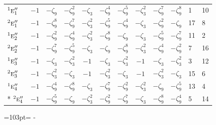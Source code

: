 \documentclass[10pt,a4paper]{article}
\newcommand{\needspace}[1]{\par\penalty-100\begingroup\dimen0=#1\relax\dimen2=\pagegoal
  \advance\dimen2-\pagetotal\ifdim\dimen0>\dimen2\relax\ifdim\dimen2>0pt\vfil\break\fi\fi
  \endgroup}
\numberwithin{equation}{section}
\newcommand{\irr}[1]{\text{\normalfont\scshape #1}}
\newcommand{\conjpair}[1]{{}^{#1}}
\newcommand{\rootunity}[1]{\zeta_{#1}}
\begin{document}
{\begin{longtable}{@{}lcccccccccll@{}}
$\conjpair{1}\irr{e}_{1}''$ & $-1$ & $-\rootunity{9}$ & $-\rootunity{9}^{2}$ & $-\rootunity{3}$ & $-\rootunity{9}^{4}$ & $-\rootunity{9}^{5}$ & $-\rootunity{3}^{2}$ & $-\rootunity{9}^{7}$ & $-\rootunity{9}^{8}$ & 1 & 10\\
$\conjpair{2}\irr{e}_{1}''$ & $-1$ & $-\rootunity{9}^{8}$ & $-\rootunity{9}^{7}$ & $-\rootunity{3}^{2}$ & $-\rootunity{9}^{5}$ & $-\rootunity{9}^{4}$ & $-\rootunity{3}$ & $-\rootunity{9}^{2}$ & $-\rootunity{9}$ & 17 & 8\\
$\conjpair{1}\irr{e}_{2}''$ & $-1$ & $-\rootunity{9}^{2}$ & $-\rootunity{9}^{4}$ & $-\rootunity{3}^{2}$ & $-\rootunity{9}^{8}$ & $-\rootunity{9}$ & $-\rootunity{3}$ & $-\rootunity{9}^{5}$ & $-\rootunity{9}^{7}$ & 11 & 2\\
$\conjpair{2}\irr{e}_{2}''$ & $-1$ & $-\rootunity{9}^{7}$ & $-\rootunity{9}^{5}$ & $-\rootunity{3}$ & $-\rootunity{9}$ & $-\rootunity{9}^{8}$ & $-\rootunity{3}^{2}$ & $-\rootunity{9}^{4}$ & $-\rootunity{9}^{2}$ & 7 & 16\\
$\conjpair{1}\irr{e}_{3}''$ & $-1$ & $-\rootunity{3}$ & $-\rootunity{3}^{2}$ & $-1$ & $-\rootunity{3}$ & $-\rootunity{3}^{2}$ & $-1$ & $-\rootunity{3}$ & $-\rootunity{3}^{2}$ & 3 & 12\\
$\conjpair{2}\irr{e}_{3}''$ & $-1$ & $-\rootunity{3}^{2}$ & $-\rootunity{3}$ & $-1$ & $-\rootunity{3}^{2}$ & $-\rootunity{3}$ & $-1$ & $-\rootunity{3}^{2}$ & $-\rootunity{3}$ & 15 & 6\\
$\conjpair{1}\irr{e}_{4}''$ & $-1$ & $-\rootunity{9}^{4}$ & $-\rootunity{9}^{8}$ & $-\rootunity{3}$ & $-\rootunity{9}^{7}$ & $-\rootunity{9}^{2}$ & $-\rootunity{3}^{2}$ & $-\rootunity{9}$ & $-\rootunity{9}^{5}$ & 13 & 4\\*
$\conjpair{2}\irr{e}_{4}''$ & $-1$ & $-\rootunity{9}^{5}$ & $-\rootunity{9}$ & $-\rootunity{3}^{2}$ & $-\rootunity{9}^{2}$ & $-\rootunity{9}^{7}$ & $-\rootunity{3}$ & $-\rootunity{9}^{8}$ & $-\rootunity{9}^{4}$ & 5 & 14\\
\bottomrule\end{longtable}}
\needspace{103pt}
\end{document}
